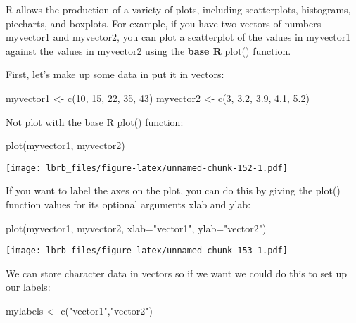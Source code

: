 \documentclass[
]{book}
\newenvironment{Shaded}{\begin{snugshade}}{\end{snugshade}}
\newcommand{\AttributeTok}[1]{\textcolor[rgb]{0.77,0.63,0.00}{#1}}
\newcommand{\DecValTok}[1]{\textcolor[rgb]{0.00,0.00,0.81}{#1}}
\newcommand{\FloatTok}[1]{\textcolor[rgb]{0.00,0.00,0.81}{#1}}
\newcommand{\FunctionTok}[1]{\textcolor[rgb]{0.00,0.00,0.00}{#1}}
\newcommand{\NormalTok}[1]{#1}
\newcommand{\OtherTok}[1]{\textcolor[rgb]{0.56,0.35,0.01}{#1}}
\newcommand{\StringTok}[1]{\textcolor[rgb]{0.31,0.60,0.02}{#1}}
\begin{document}
R allows the production of a variety of plots, including scatterplots, histograms, piecharts, and boxplots. For example, if you have two vectors of numbers myvector1 and myvector2, you can plot a scatterplot of the values in myvector1 against the values in myvector2 using the \textbf{base R} plot() function.

First, let's make up some data in put it in vectors:

\begin{Shaded}
\begin{Highlighting}[]
\NormalTok{myvector1 }\OtherTok{\textless{}{-}} \FunctionTok{c}\NormalTok{(}\DecValTok{10}\NormalTok{, }\DecValTok{15}\NormalTok{, }\DecValTok{22}\NormalTok{, }\DecValTok{35}\NormalTok{, }\DecValTok{43}\NormalTok{)}
\NormalTok{myvector2 }\OtherTok{\textless{}{-}} \FunctionTok{c}\NormalTok{(}\DecValTok{3}\NormalTok{, }\FloatTok{3.2}\NormalTok{, }\FloatTok{3.9}\NormalTok{, }\FloatTok{4.1}\NormalTok{, }\FloatTok{5.2}\NormalTok{)}
\end{Highlighting}
\end{Shaded}

Not plot with the base R plot() function:

\begin{Shaded}
\begin{Highlighting}[]
\FunctionTok{plot}\NormalTok{(myvector1, myvector2)}
\end{Highlighting}
\end{Shaded}

\texttt{[image: lbrb\_files/figure-latex/unnamed-chunk-152-1.pdf]}

If you want to label the axes on the plot, you can do this by giving the plot() function values for its optional arguments xlab and ylab:

\begin{Shaded}
\begin{Highlighting}[]
\FunctionTok{plot}\NormalTok{(myvector1, }
\NormalTok{     myvector2, }
     \AttributeTok{xlab=}\StringTok{"vector1"}\NormalTok{, }
     \AttributeTok{ylab=}\StringTok{"vector2"}\NormalTok{)}
\end{Highlighting}
\end{Shaded}

\texttt{[image: lbrb\_files/figure-latex/unnamed-chunk-153-1.pdf]}

We can store character data in vectors so if we want we could do this to set up our labels:

\begin{Shaded}
\begin{Highlighting}[]
\NormalTok{mylabels }\OtherTok{\textless{}{-}}  \FunctionTok{c}\NormalTok{(}\StringTok{"vector1"}\NormalTok{,}\StringTok{"vector2"}\NormalTok{)}
\end{Highlighting}
\end{Shaded}
\end{document}
